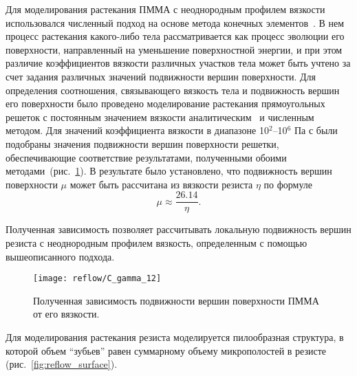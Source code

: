 Для моделирования растекания ПММА с неоднородным профилем вязкости использовался численный подход на основе метода конечных элементов~\cite{Brakke_SE}. В нем процесс растекания какого-либо тела рассматривается как процесс эволюции его поверхности, направленный на уменьшение поверхностной энергии, и при этом различие коэффициентов вязкости различных участков тела может быть учтено за счет задания различных значений подвижности вершин поверхности. Для определения соотношения, связывающего вязкость тела и подвижность вершин его поверхности было проведено моделирование растекания прямоугольных решеток с постоянным значением вязкости аналитическим~\cite{Leveder_2010} и численным методом. Для значений коэффициента вязкости в диапазоне 10$^2$--10$^6$ Па с были подобраны значения подвижности вершин поверхности решетки, обеспечивающие соответствие результатами, полученными обоими методами~(рис.~\ref{fig:C_gamma}). В результате было установлено, что подвижность вершин поверхности $\mu$ может быть рассчитана из вязкости резиста $\eta$ по формуле
\begin{equation}
	\mu \approx \frac{26.14}{\eta}.
\end{equation}

Полученная зависимость позволяет рассчитывать локальную подвижность вершин резиста с неоднородным профилем вязкость, определенным с помощью вышеописанного подхода.

\begin{figure}[h]
	\begin{center}
		\texttt{[image: reflow/С\_gamma\_12]}
	\end{center}
	\vspace{-1.2em}
	\caption{Полученная зависимость подвижности вершин поверхности ПММА от его вязкости.}
	\label{fig:C_gamma}
\end{figure}

Для моделирования растекания резиста моделируется пилообразная структура, в которой объем ``зубьев'' равен суммарному объему микрополостей в резисте (рис.~\ref{fig:reflow_surface}).

